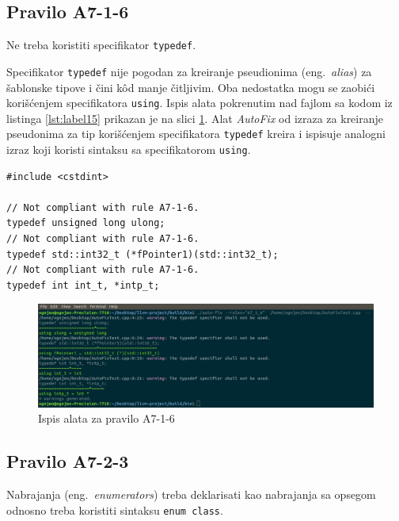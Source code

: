 \documentclass[12pt,oneside]{memoir}
\begin{document}
\subsection{Pravilo A7-1-6}
\begin{center}
\begin{tcolorbox}
Ne treba koristiti specifikator \texttt{typedef}. 
\end{tcolorbox}
\end{center}

Specifikator \texttt{typedef} nije pogodan za kreiranje pseudionima (eng.~\textit{alias}) za \v{s}ablonske tipove i \v{c}ini k\^{o}d manje \v{c}itljivim.
Oba nedostatka mogu se zaobi\'{c}i kori\v{s}\'{c}enjem specifikatora \texttt{using}.  Ispis alata pokrenutim nad fajlom sa kodom iz listinga \ref{lst:label15} prikazan je na slici \ref{fig:A7-1-6}. Alat \textit{AutoFix} od izraza za kreiranje pseudonima za tip kori\v{s}\'{c}enjem
specifikatora \texttt{typedef} kreira i ispisuje analogni izraz koji koristi sintaksu sa specifikatorom \texttt{using}.

\begin{lstlisting}[style=customc, caption={Primer koda koji nije napisan u skladu sa pravilom \textbf{A7-1-6}, odnosno koristi specifikator \texttt{typedef}.}, label=lst:label15]
#include <cstdint>

// Not compliant with rule A7-1-6.
typedef unsigned long ulong;
// Not compliant with rule A7-1-6.
typedef std::int32_t (*fPointer1)(std::int32_t);
// Not compliant with rule A7-1-6.
typedef int int_t, *intp_t;

\end{lstlisting}

\begin{figure}[!h]
\begin{center}
\includegraphics[scale=0.3]{A7_1_6.png}
\end{center}
\caption{Ispis alata za pravilo A7-1-6}
\label{fig:A7-1-6}
\end{figure}


\subsection{Pravilo A7-2-3}
\begin{center}
\begin{tcolorbox}
Nabrajanja (eng.~\textit{enumerators}) treba deklarisati kao nabrajanja sa opsegom odnosno treba koristiti sintaksu \texttt{enum class}.
\end{tcolorbox}
\end{center}
\end{document}
